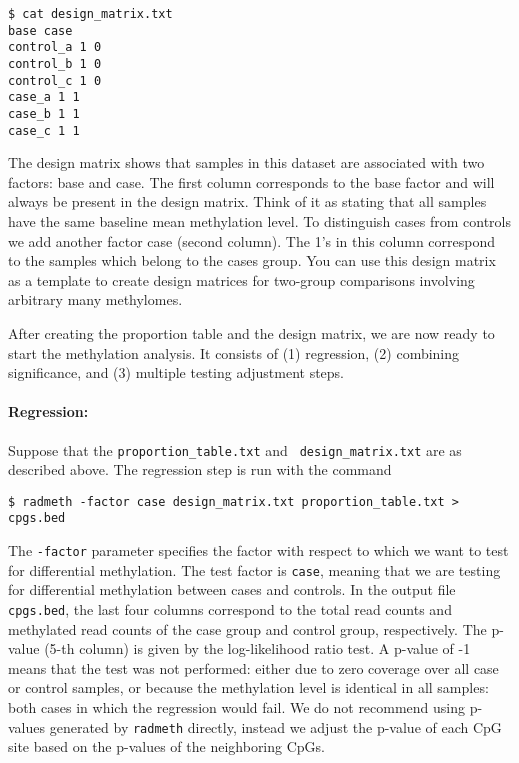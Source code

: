 \documentclass[10pt]{article}
\begin{document}
{\small{%
\begin{verbatim}
$ cat design_matrix.txt
base case
control_a 1 0
control_b 1 0
control_c 1 0
case_a 1 1
case_b 1 1
case_c 1 1
\end{verbatim}%
}}

The design matrix shows that samples in this dataset are associated with two
factors: base and case. The first column corresponds to the base factor and
will always be present in the design matrix. Think of it as stating that all
samples have the same baseline mean methylation level. To distinguish
cases from controls we add another factor case (second column). The 1's in
this column correspond to the samples which belong to the cases group. You
can use this design matrix as a template to create design matrices for
two-group comparisons involving arbitrary many methylomes.

After creating the proportion table and the design matrix, we are now ready
to start the methylation analysis. It consists of (1) regression, (2)
combining significance, and (3) multiple testing adjustment steps.

\paragraph{Regression:} Suppose that the {\tt proportion\_table.txt} and {\tt
design\_matrix.txt} are as described above. The regression step is run with
the command

{\small{%
\begin{verbatim}
$ radmeth -factor case design_matrix.txt proportion_table.txt > cpgs.bed
\end{verbatim}%
}}

The {\tt -factor} parameter specifies the factor with respect to which we
want to test for differential methylation. The test factor is {\tt case},
meaning that we are testing for differential methylation between cases and
controls.
In the output file {\tt cpgs.bed},
the last four columns correspond to the total read counts and
methylated read counts of the case group and control group, respectively.
The p-value (5-th column) is given by the log-likelihood ratio test. A
p-value of -1 means that the test was not performed: either due to zero
coverage over all case or control samples, or because the methylation level
is identical in all samples: both cases in which the regression would fail.
We do not recommend using p-values generated by {\tt radmeth} directly,
instead we adjust the p-value of each CpG site based on the p-values of the
neighboring CpGs.
\end{document}
